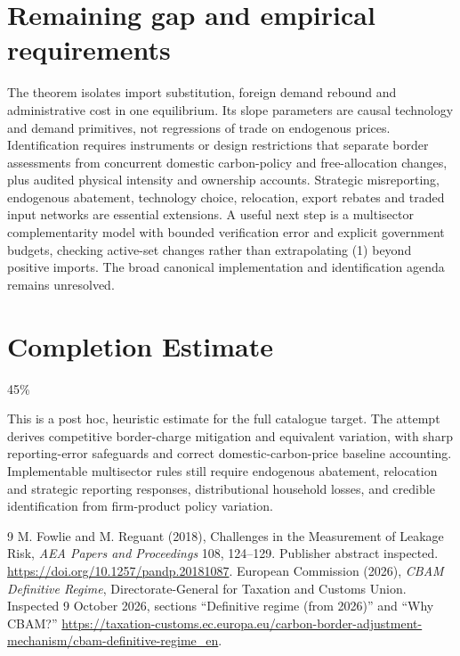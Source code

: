 \documentclass[11pt]{article}
\begin{document}
\section{Remaining gap and empirical requirements}
The theorem isolates import substitution, foreign demand rebound and
administrative cost in one equilibrium. Its slope parameters are causal
technology and demand primitives, not regressions of trade on endogenous
prices. Identification requires instruments or design restrictions that
separate border assessments from concurrent domestic carbon-policy and
free-allocation changes, plus audited physical intensity and ownership
accounts. Strategic misreporting, endogenous abatement, technology choice,
relocation, export rebates and traded input networks are essential
extensions. A useful next step is a multisector complementarity model
with bounded verification error and explicit government budgets, checking
active-set changes rather than extrapolating (1) beyond positive imports.
The broad canonical implementation and identification agenda remains
unresolved.

\section{Completion Estimate}
45\%

This is a post hoc, heuristic estimate for the full catalogue target.
The attempt derives competitive border-charge mitigation and equivalent variation, with sharp reporting-error safeguards and correct domestic-carbon-price baseline accounting. Implementable multisector rules still require endogenous abatement, relocation and strategic reporting responses, distributional household losses, and credible identification from firm-product policy variation.

\begin{thebibliography}{9}
 M. Fowlie and M. Reguant (2018), Challenges in the Measurement
of Leakage Risk, \emph{AEA Papers and Proceedings} 108, 124--129.
Publisher abstract inspected. \url{https://doi.org/10.1257/pandp.20181087}.
 European Commission (2026), \emph{CBAM Definitive Regime},
Directorate-General for Taxation and Customs Union. Inspected 9 October
2026, sections ``Definitive regime (from 2026)'' and ``Why CBAM?''
\url{https://taxation-customs.ec.europa.eu/carbon-border-adjustment-mechanism/cbam-definitive-regime_en}.
\end{thebibliography}
\end{document}
